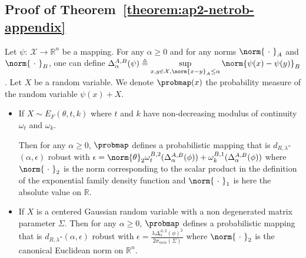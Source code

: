 \subsection{Proof of Theorem~\ref{theorem:ap2-netrob-appendix}}

\begin{lemma}
\label{theorem:ap2-exprob-appendix}

Let $\psi:\ \mathcal{X} \rightarrow \mathbb{R}^{n}$ be a mapping. For any $\alpha\geq0$ and for any norms $\norm{\ \cdot\ }_A$ and $\norm{\ \cdot\ }_B$, one can define $\Delta^{A,B}_{\alpha}(\psi) \triangleq \sup\limits_{ x,y \in \mathcal{X}, \norm{x - y}_A \leq \alpha} \norm{\psi(x) - \psi(y)}_B$. Let $X$ be a random variable. We denote $\probmap(x)$ the probability measure of the random variable $\psi(x)+X$. 
\begin{itemize}
    \item If $X\sim E_{F}(\theta,t,k)$  where $t$ and $k$ have non-decreasing modulus of continuity $\omega_t$ and $\omega_k$. 

Then for any $\alpha \geq 0$, $\probmap$ defines a probabilistic mapping that is $d_{R,\lambda}$-$(\alpha,\epsilon)$ robust
with $\epsilon = \norm{\theta}_2 \omega^{B,2}_t(\Delta^{A,B}_{\alpha}(\phi)) +\omega_k^{B,1}(\Delta^{A,B}_{\alpha}(\phi)) $ where $\norm{\ \cdot\ }_2$ is the norm corresponding to the scalar product in the definition of the exponential family density function and $\norm{\ \cdot\ }_1$ is here the absolute value on $\mathbb{R}$.
\item If $X$ is a centered Gaussian random variable with a non degenerated matrix parameter $\Sigma$. Then for any $\alpha \geq 0$, $\probmap$ defines a probabilistic mapping that is $d_{R,\lambda}$-$(\alpha,\epsilon)$ robust
with $ \epsilon = \frac{\lambda \Delta^{A,2}_{\alpha}(\phi)^2 }{2 \sigma_{min}(\Sigma) } $ where $\norm{\ \cdot\ }_2$ is the canonical Euclidean norm on $\mathbb{R}^n$.
\end{itemize}
\end{lemma}


